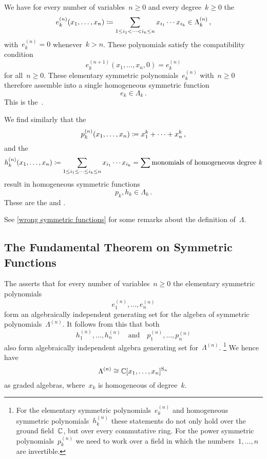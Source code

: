 \documentclass[a4paper, 11pt, twoside=semi]{scrartcl}
\begin{document}
\begin{example}
  We have for every number of variables~$n \geq 0$ and every degree~$k \geq 0$ the 
  \[
    e^{(n)}_k(x_1, \dotsc, x_n)
    \coloneqq
    \sum_{1 \leq i_1 < \dotsb < i_k \leq n}
    x_{i_1} \dotsm x_{i_k}
    \in
    \Lambda^{(n)}_k \,,
  \]
  with~$e^{(n)}_k = 0$ whenever~$k > n$.
  These polynomials satisfy the compatibility condition
  \[
    e^{(n+1)}_k(x_1, \dotsc, x_n, 0)
    =
    e^{(n)}_k
  \]
  for all~$n \geq 0$.
  These elementary symmetric polynomials~$e^{(n)}_k$ with~$n \geq 0$ therefore assemble into a single homogeneous symmetric function
  \[
    e_k \in \Lambda_k \,.
  \]
  This is the~. 

  We find similarly that the 
  \[
    p^{(n)}_k(x_1, \dotsc, x_n)
    \coloneqq
    x_1^k + \dotsb + x_n^k \,,
  \]
  and the 
  \[
    h^{(n)}_k(x_1, \dotsc, x_n)
    \coloneqq
    \sum_{1 \leq i_1 \leq \dotsb \leq i_k \leq n}
    x_{i_1} \dotsm x_{i_k}
    =
    \sum \text{monomials of homogeneous degree~$k$}
  \]
  result in homogeneous symmetric functions
  \[
    p_k, h_k
    \in
    \Lambda_k \,.
  \]
  These are the  and .
\end{example}

See \cref{wrong symmetric functions} for some remarks about the definition of~$\Lambda$.



\subsection{The Fundamental Theorem on Symmetric Functions}

The  asserts that for every number of variables~$n \geq 0$ the elementary symmetric polynomials
\[
  e^{(n)}_1, \dotsc, e^{(n)}_n
\]
form an algebraically independent generating set for the algebra of symmetric polynomials~$\Lambda^{(n)}$.
It follows from this that both
\[
  h^{(n)}_1, \dotsc, h^{(n)}_n
  \quad\text{and}\quad
  p^{(n)}_1, \dotsc, p^{(n)}_n
\]
also form algebraically independent algebra generating set for~$\Lambda^{(n)}$.%
\footnote{
  For the elementary symmetric polynomials~$e^{(n)}_k$ and homogeneous symmetric polynomials~$h^{(n)}_k$ these statements do not only hold over the ground field~$\mathbb{C}$, but over every commutative ring.
  For the power symmetric polynomials~$p^{(n)}_k$ we need to work over a field in which the numbers~$1, \dotsc, n$ are invertible.
}
We hence have
\[
  \Lambda^{(n)}
  \cong
  \mathbb{C}[x_1, \dotsc, x_n]^{\mathrm{S}_n}
\]
as graded algebras, where~$x_k$ is homogeneous of degree~$k$.
\end{document}
